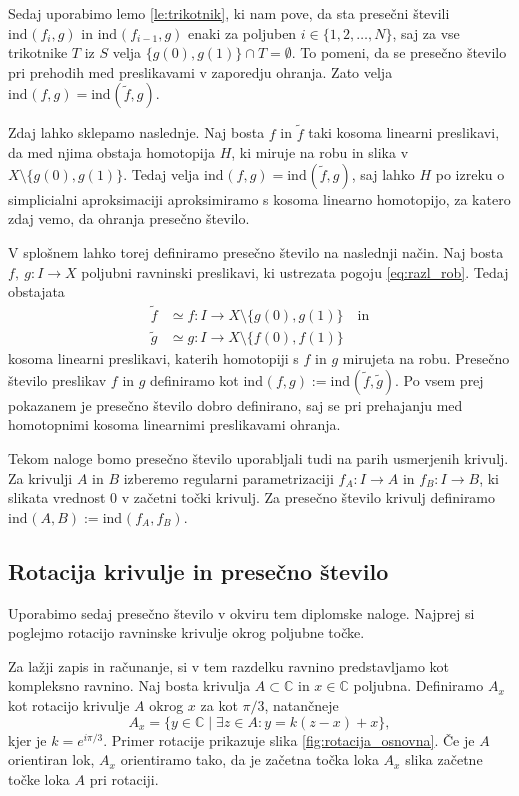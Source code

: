 \documentclass[mat1]{fmfdelo}
\newcommand{\C}{\mathbb C}
\newcommand{\ind}[3][]{\text{ind}_{#1}(#2, #3)}
\begin{document}
Sedaj uporabimo lemo \ref{le:trikotnik}, ki nam pove, da sta presečni števili $\ind{f_i}{g}$ in $\ind{f_{i-1}}{g}$ enaki za poljuben $i\in \{1, 2, \ldots , N\}$, saj za vse trikotnike $T$ iz $S$ velja $\{g(0), g(1) \} \cap T = \emptyset$. To pomeni, da se presečno število pri prehodih med preslikavami v zaporedju ohranja. Zato velja $\ind{f}{g} = \ind{\widetilde{f}}{g}$.
\endproof

Zdaj lahko sklepamo naslednje. Naj bosta $f$ in $\widetilde{f}$ taki kosoma linearni preslikavi, da med njima obstaja homotopija $H$, ki miruje na robu in slika v $X \setminus \{ g(0), g(1)\}$. Tedaj velja $\ind{f}{g} = \ind{\widetilde{f}}{g}$, saj lahko $H$ po izreku o simplicialni aproksimaciji \cite{hatcher_alg_top} aproksimiramo s kosoma linearno homotopijo, za katero zdaj vemo, da ohranja presečno število. 

V splošnem lahko torej definiramo presečno število na naslednji način. Naj bosta $f,\ g\colon I \to X$ poljubni ravninski preslikavi, ki ustrezata pogoju \eqref{eq:razl_rob}. Tedaj obstajata 
\begin{align*}
\widetilde{f} &\simeq f\colon I \to X \setminus \{g(0), g(1)\} \quad \text{in} \\
\widetilde{g} &\simeq g\colon I \to X \setminus \{f(0), f(1)\}
\end{align*}
kosoma linearni preslikavi, katerih homotopiji s $f$ in $g$ mirujeta na robu. Presečno število preslikav $f$ in $g$ definiramo kot $\ind{f}{g} := \ind{\widetilde{f}}{\widetilde{g}}$. Po vsem prej pokazanem je presečno število dobro definirano, saj se pri prehajanju med homotopnimi kosoma linearnimi preslikavami ohranja.

Tekom naloge bomo presečno število uporabljali tudi na parih usmerjenih krivulj. Za krivulji $A$ in $B$ izberemo regularni parametrizaciji $f_A \colon I \to A$ in $f_B \colon I \to B$, ki slikata vrednost $0$ v začetni točki krivulj. Za presečno število krivulj definiramo $\ind{A}{B} := \ind{f_A}{f_B}$.

\subsection{Rotacija krivulje in presečno število}

Uporabimo sedaj presečno število v okviru tem diplomske naloge. Najprej si poglejmo rotacijo ravninske krivulje okrog poljubne točke.

Za lažji zapis in računanje, si v tem razdelku ravnino predstavljamo kot kompleksno ravnino. Naj bosta krivulja $A \subset \C$ in $x \in \C$ poljubna. Definiramo $A_x$ kot rotacijo krivulje $A$ okrog $x$ za kot $\pi/3$, natančneje 
\[
A_x = \{ y \in \C \mid \exists z \in A: y = k(z-x) + x\},
\]
kjer je $k = e^{i\pi / 3}$. Primer rotacije prikazuje slika \ref{fig:rotacija_osnovna}. Če je $A$ orientiran lok, $A_x$ orientiramo tako, da je začetna točka loka $A_x$ slika začetne točke loka $A$ pri rotaciji.
\end{document}
